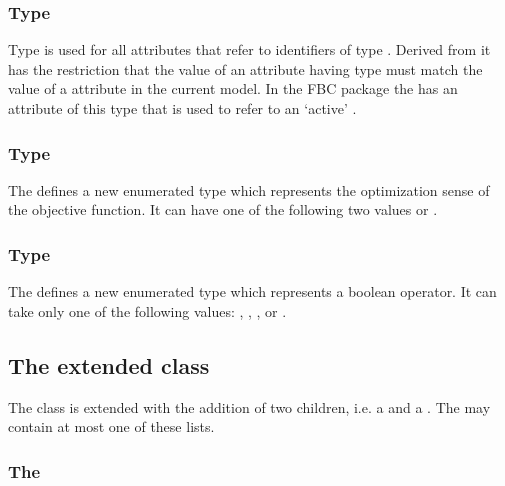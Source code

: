 \subsubsection{Type }
\label{primtype-fbcsidref}

Type  is used for all attributes that refer to
identifiers of type .  Derived from
 it has the restriction that the value of an
attribute having type  must match the value of a
 attribute in the current model. In the FBC package the
\ListOfObjectives has an attribute of this type that is used to refer to an
`active' \Objective.

\subsubsection{Type }
\label{primtype-fbctype}

The \FBCPackage defines a new enumerated type  which
represents the optimization sense of the objective function. It can have one
of the following two values  or .


\subsubsection{Type }
\label{primtype-fbcoperation}

The \FBCPackage defines a new enumerated type  which
represents a boolean operator. It can take only one of the following values:
, , ,  or
.

\subsection{The extended  class}
\label{sbml-model}
\label{model-class}
\label{listoffluxbounds-class}
\label{listofobjectives-class}

The \SBML \Model class is extended with the addition of two children, i.e. a
 and a . The \Model may
contain at most one of these lists.

\subsubsection{The \FBC {}}


